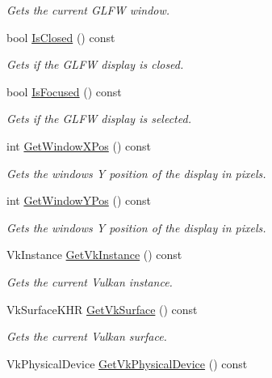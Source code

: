 \begin{DoxyCompactItemize}
\begin{DoxyCompactList}\small\item\em Gets the current G\+L\+FW window. \end{DoxyCompactList}\item 
bool \hyperlink{class_flounder_1_1_display_a70757967090cb967b3a67adccb22f9d1}{Is\+Closed} () const
\begin{DoxyCompactList}\small\item\em Gets if the G\+L\+FW display is closed. \end{DoxyCompactList}\item 
bool \hyperlink{class_flounder_1_1_display_a9119c09b79c10f4b68ef63244daea1fc}{Is\+Focused} () const
\begin{DoxyCompactList}\small\item\em Gets if the G\+L\+FW display is selected. \end{DoxyCompactList}\item 
int \hyperlink{class_flounder_1_1_display_a8187c1bc4d844c010527a11c7f79d46a}{Get\+Window\+X\+Pos} () const
\begin{DoxyCompactList}\small\item\em Gets the windows Y position of the display in pixels. \end{DoxyCompactList}\item 
int \hyperlink{class_flounder_1_1_display_a6193e39f387429a196223fce87f2a484}{Get\+Window\+Y\+Pos} () const
\begin{DoxyCompactList}\small\item\em Gets the windows Y position of the display in pixels. \end{DoxyCompactList}\item 
Vk\+Instance \hyperlink{class_flounder_1_1_display_aefd86e2034619b11db19bf7f3703399a}{Get\+Vk\+Instance} () const
\begin{DoxyCompactList}\small\item\em Gets the current Vulkan instance. \end{DoxyCompactList}\item 
Vk\+Surface\+K\+HR \hyperlink{class_flounder_1_1_display_a707b1f26d62b5f065cb84c854c10c33b}{Get\+Vk\+Surface} () const
\begin{DoxyCompactList}\small\item\em Gets the current Vulkan surface. \end{DoxyCompactList}\item 
Vk\+Physical\+Device \hyperlink{class_flounder_1_1_display_a39f7f54ed594d03e338faae3ed104334}{Get\+Vk\+Physical\+Device} () const

\end{DoxyCompactItemize}
